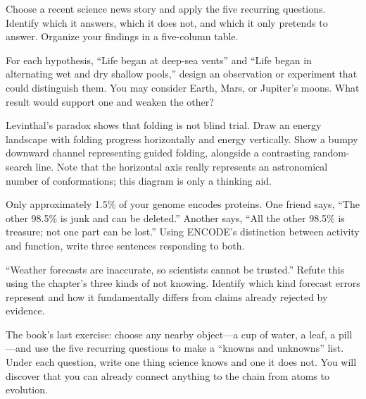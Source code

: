 \begin{sikaoti}
\item Choose a recent science news story and apply the five recurring questions. Identify which it answers, which it does not, and which it only pretends to answer. Organize your findings in a five-column table.
\item For each hypothesis, ``Life began at deep-sea vents'' and ``Life began in alternating wet and dry shallow pools,'' design an observation or experiment that could distinguish them. You may consider Earth, Mars, or Jupiter's moons. What result would support one and weaken the other?
\item Levinthal's paradox shows that folding is not blind trial. Draw an energy landscape with folding progress horizontally and energy vertically. Show a bumpy downward channel representing guided folding, alongside a contrasting random-search line. Note that the horizontal axis really represents an astronomical number of conformations; this diagram is only a thinking aid.
\item Only approximately 1.5\% of your genome encodes proteins. One friend says, ``The other 98.5\% is junk and can be deleted.'' Another says, ``All the other 98.5\% is treasure; not one part can be lost.'' Using ENCODE's distinction between activity and function, write three sentences responding to both.
\item ``Weather forecasts are inaccurate, so scientists cannot be trusted.'' Refute this using the chapter's three kinds of not knowing. Identify which kind forecast errors represent and how it fundamentally differs from claims already rejected by evidence.
\item The book's last exercise: choose any nearby object---a cup of water, a leaf, a pill---and use the five recurring questions to make a ``knowns and unknowns'' list. Under each question, write one thing science knows and one it does not. You will discover that you can already connect anything to the chain from atoms to evolution.
\end{sikaoti}
